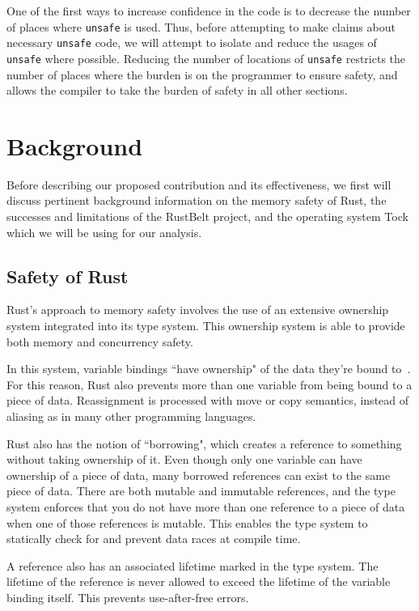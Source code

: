 \documentclass[12pt]{article}
\begin{document}
One of the first ways to increase confidence in the code is to decrease the number of places where \texttt{unsafe} is used. Thus, before attempting to make claims about necessary \texttt{unsafe} code, we will attempt to isolate and reduce the usages of \texttt{unsafe} where possible. Reducing the number of locations of \texttt{unsafe} restricts the number of places where the burden is on the programmer to ensure safety, and allows the compiler to take the burden of safety in all other sections.

\section{Background}
Before describing our proposed contribution and its effectiveness, we first will discuss pertinent background information on the memory safety of Rust, the successes and limitations of the RustBelt project, and the operating system Tock~\cite{levy2017tock} which we will be using for our analysis.

\subsection{Safety of Rust}
Rust's approach to memory safety involves the use of an extensive ownership system integrated into its type system. This ownership system is able to provide both memory and concurrency safety. 

In this system, variable bindings ``have ownership" of the data they're bound to~\cite{rust_book}.
For this reason, Rust also prevents more than one variable from being bound to a piece of data. Reassignment is processed with move or copy semantics, instead of aliasing as in many other programming languages.

Rust also has the notion of ``borrowing", which creates a reference to something without taking ownership of it. Even though only one variable can have ownership of a piece of data, many borrowed references can exist to the same piece of data. There are both mutable and immutable references, and the type system enforces that you do not have more than one reference to a piece of data when one of those references is mutable. This enables the type system to statically check for and prevent data races at compile time.

A reference also has an associated lifetime marked in the type system. The lifetime of the reference is never allowed to exceed the lifetime of the variable binding itself. This prevents use-after-free errors.
\end{document}
